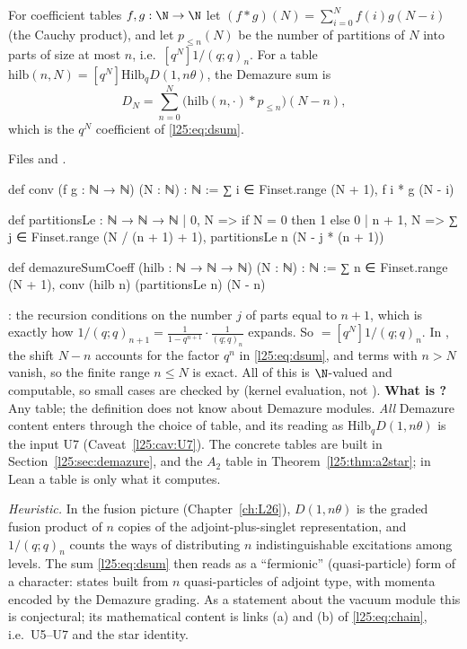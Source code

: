 \begin{definition}\label{l25:def:dsum}
For coefficient tables $f,g:\N\to\N$ let $(f\ast g)(N)=\sum_{i=0}^Nf(i)g(N-i)$ (the Cauchy product), and let
$p_{\le n}(N)$ be the number of partitions of $N$ into parts of size at most $n$, i.e.\ $[q^N]1/(q;q)_n$. For a
table $\mathrm{hilb}(n,N)=[q^N]\mathrm{Hilb}_qD(1,n\theta)$, the Demazure sum is
\begin{equation*}
D_N=\sum_{n=0}^{N}\big(\mathrm{hilb}(n,\cdot)\ast p_{\le n}\big)(N-n),
\end{equation*}
which is the $q^N$ coefficient of \eqref{l25:eq:dsum}.
\end{definition}
\noindent Files  and
.
\begin{leancode}
def conv (f g : ℕ → ℕ) (N : ℕ) : ℕ :=
  ∑ i ∈ Finset.range (N + 1), f i * g (N - i)

def partitionsLe : ℕ → ℕ → ℕ
  | 0, N => if N = 0 then 1 else 0
  | n + 1, N => ∑ j ∈ Finset.range (N / (n + 1) + 1), partitionsLe n (N - j * (n + 1))

def demazureSumCoeff (hilb : ℕ → ℕ → ℕ) (N : ℕ) : ℕ :=
  ∑ n ∈ Finset.range (N + 1), conv (hilb n) (partitionsLe n) (N - n)
\end{leancode}
\begin{dictionary}
: the recursion conditions on the number $j$ of parts equal to $n+1$, which is
exactly how $1/(q;q)_{n+1}=\frac{1}{1-q^{n+1}}\cdot\frac{1}{(q;q)_n}$ expands. So
 $=[q^N]1/(q;q)_n$. In , the shift $N-n$ accounts for the
factor $q^n$ in \eqref{l25:eq:dsum}, and terms with $n>N$ vanish, so the finite range $n\le N$ is exact. All of
this is $\N$-valued and computable, so small cases are checked by  (kernel evaluation,
not ). \textbf{What is ?} Any table; the definition does not know about
Demazure modules. \emph{All} Demazure content enters through the choice of table, and its reading as
$\mathrm{Hilb}_qD(1,n\theta)$ is the input U7 (Caveat~\ref{l25:cav:U7}). The concrete tables are built in
Section~\ref{l25:sec:demazure}, and the $A_2$ table in Theorem~\ref{l25:thm:a2star}; in Lean a table is only what it
computes.
\end{dictionary}
\begin{physics}
\emph{Heuristic.} In the fusion picture (Chapter~\ref{ch:L26}), $D(1,n\theta)$ is the graded fusion product of $n$
copies of the adjoint-plus-singlet representation, and $1/(q;q)_n$ counts the ways of distributing $n$
indistinguishable excitations among levels. The sum \eqref{l25:eq:dsum} then reads as a ``fermionic''
(quasi-particle) form of a character: states built from $n$ quasi-particles of adjoint type, with momenta encoded by
the Demazure grading. As a statement about the vacuum module this is conjectural; its mathematical content is links
(a) and (b) of \eqref{l25:eq:chain}, i.e.\ U5--U7 and the star identity.
\end{physics}
